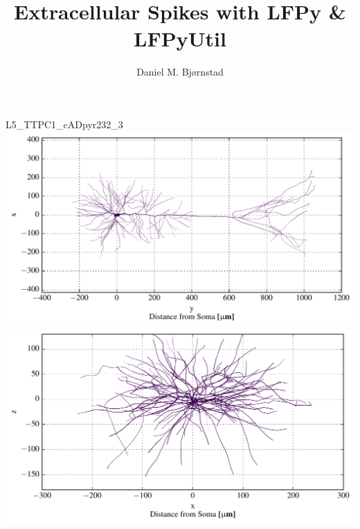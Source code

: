 \documentclass{beamer}
\title[Some title] %
{Extracellular Spikes with LFPy \& LFPyUtil}
\author %
{Daniel M. Bj\o rnstad}
\begin{document}
\begin{frame}
  \titlepage
\end{frame}







\begin{frame}{L5\_TTPC1\_cADpyr232\_3}{}
    \centering
    \includegraphics[height=0.4\textheight]{images/ttpc1_morph_xy.pdf}\\
    \includegraphics[height=0.4\textheight]{images/ttpc1_morph_xz.pdf}
\end{frame}
\end{document}
